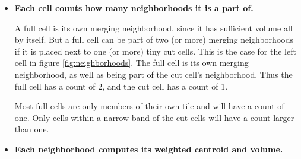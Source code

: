 \begin{itemize}

\item
{\bf Each cell counts how many neighborhoods it is a part of.}

\vspace*{.1in}
A full cell is its own merging neighborhood, since it has sufficient
volume all by itself.
But a full cell can be part of 
two (or more)  merging neighborhoods  if it is placed next to 
one (or more)  tiny cut cells. This is the case for the left cell in figure
\ref{fig:neighborhoods}. The full cell is its own merging neighborhood, 
as well as being part of the cut cell's neighborhood. Thus the full cell has a
count of 2, and the cut cell has a count of 1.

Most full
cells are only members of their own tile and will have a count of one.
Only cells within a narrow band of the cut cells will have a count
larger than one.

\item
{\bf Each neighborhood computes its weighted centroid and volume.}


\end{itemize}
